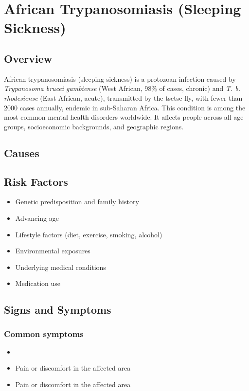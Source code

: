 \chapter{African Trypanosomiasis (Sleeping Sickness)}
\label{sec:African Trypanosomiasis}

\section{Overview}
African trypanosomiasis (sleeping sickness) is a protozoan infection caused by \textit{Trypanosoma brucei gambiense} (West African, 98\% of cases, chronic) and \textit{T. b. rhodesiense} (East African, acute), transmitted by the tsetse fly, with fewer than 2000 cases annually, endemic in sub-Saharan Africa. This condition is among the most common mental health disorders worldwide. It affects people across all age groups, socioeconomic backgrounds, and geographic regions.
\section{Causes}
\section{Risk Factors}

\begin{itemize}[noitemsep]
  \item Genetic predisposition and family history
  \item Advancing age
  \item Lifestyle factors (diet, exercise, smoking, alcohol)
  \item Environmental exposures
  \item Underlying medical conditions
  \item Medication use
\end{itemize}
\section{Signs and Symptoms}

\subsection{Common symptoms}
\begin{itemize}[noitemsep]
  \item \item Pain or discomfort in the affected area    \item Pain or discomfort in the affected area
  \end{itemize}

